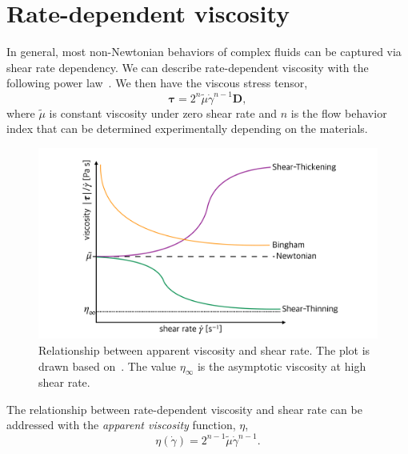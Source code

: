 \section{Rate-dependent viscosity}
In general, most non-Newtonian behaviors of complex fluids can be captured via shear rate dependency. 
We can describe rate-dependent viscosity with the following power law~\cite{herschel_konsistenzmessungen_1926}. We then have the viscous stress tensor, 
\begin{equation}
  {\bm \tau}
  =2^n \tilde{\mu} \dot{\gamma} ^{n-1} {\bm D},
  \label{eq_HS_tau}
  \end{equation}
where $\tilde{\mu}$ is constant viscosity under zero shear rate and $n$ is the flow behavior index that can be determined experimentally depending on the materials.
\begin{figure}[ht]
  \begin{center}
    \includegraphics[scale=0.19]{figures/fig_appr_viscosity.pdf}
    \end{center}
  \caption{Relationship between apparent viscosity and shear rate. The plot is drawn based on~\cite{irgens_rheology_2014}. The value $\eta_{\infty}$ is the asymptotic viscosity at high shear rate.}
  \label{fig_appr_viscosity}
\end{figure}
The relationship between rate-dependent viscosity and shear rate can be addressed with the \textit{apparent viscosity} function, $\eta$,
\begin{equation}
  \eta(\dot{\gamma})
    =2^{n-1} \tilde{\mu} \dot{\gamma} ^{n-1}.
  \label{eq_appr_viscosity}
\end{equation}
